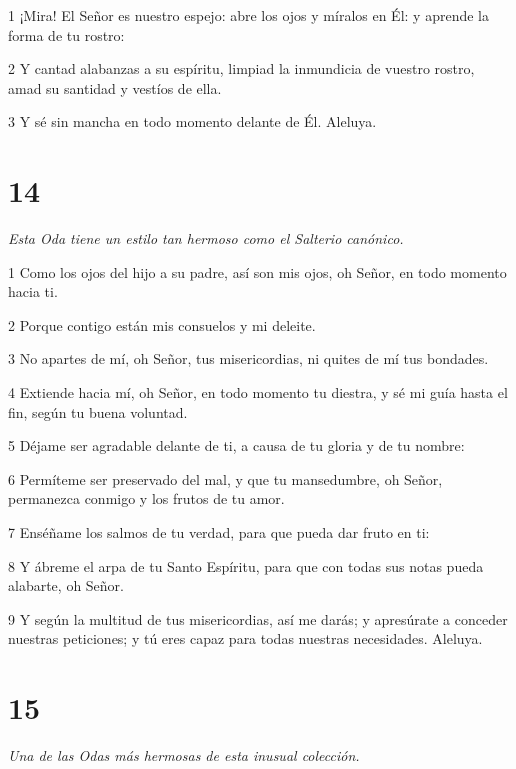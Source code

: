 \par 1 ¡Mira! El Señor es nuestro espejo: abre los ojos y míralos en Él: y aprende la forma de tu rostro:
\par 2 Y cantad alabanzas a su espíritu, limpiad la inmundicia de vuestro rostro, amad su santidad y vestíos de ella.
\par 3 Y sé sin mancha en todo momento delante de Él. Aleluya.

\chapter{14}

\par \textit{Esta Oda tiene un estilo tan hermoso como el Salterio canónico.}

\par 1 Como los ojos del hijo a su padre, así son mis ojos, oh Señor, en todo momento hacia ti.
\par 2 Porque contigo están mis consuelos y mi deleite.
\par 3 No apartes de mí, oh Señor, tus misericordias, ni quites de mí tus bondades.
\par 4 Extiende hacia mí, oh Señor, en todo momento tu diestra, y sé mi guía hasta el fin, según tu buena voluntad.
\par 5 Déjame ser agradable delante de ti, a causa de tu gloria y de tu nombre:
\par 6 Permíteme ser preservado del mal, y que tu mansedumbre, oh Señor, permanezca conmigo y los frutos de tu amor.
\par 7 Enséñame los salmos de tu verdad, para que pueda dar fruto en ti:
\par 8 Y ábreme el arpa de tu Santo Espíritu, para que con todas sus notas pueda alabarte, oh Señor.
\par 9 Y según la multitud de tus misericordias, así me darás; y apresúrate a conceder nuestras peticiones; y tú eres capaz para todas nuestras necesidades. Aleluya.



\chapter{15}

\par \textit{Una de las Odas más hermosas de esta inusual colección.}

